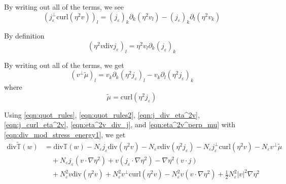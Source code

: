 \documentclass[a4paper]{article}
\newcommand{\curl}{\mathrm{curl}}
\renewcommand{\div}{\mathrm{div}}
\begin{document}
By writing out all of the terms, we see
\begin{equation}
  (j_\varepsilon^\perp \curl ( \eta^2 v ) )_l = (j_\varepsilon)_k \partial_k ( \eta^2 v_l ) - (j_\varepsilon)_k \partial_l ( \eta^2 v_k )
  \label{eqn:j_curl_eta^2v}
\end{equation}

By definition
\begin{equation}
  ( \eta^2 v \div j_\varepsilon )_l = \eta^2 v_l \partial_k (j_\varepsilon)_k
  \label{eqn:eta^2v_div_j}
\end{equation}

By writing out all of the terms, we get
\begin{equation}
  ( v^\perp \tilde{\mu} )_l = v_k \partial_k (\eta^2 j_\varepsilon)_l - v_k \partial_l (\eta^2 j_\varepsilon)_k
  \label{eqn:eta^2v^perp_mu}
\end{equation}
where
\begin{equation}
  \tilde{\mu} = \curl ( \eta^2 j_\varepsilon )
  \label{eqn:mu}
\end{equation}

Using \eqref{eqn:quot_rules}, \eqref{eqn:quot_rules2}, \eqref{eqn:j_div_eta^2v}, \eqref{eqn:j_curl_eta^2v}, \eqref{eqn:eta^2v_div_j}, and \eqref{eqn:eta^2v^perp_mu} with
\eqref{eqn:div_mod_stress_energy1}, we get
\begin{align}
  \div \tilde{\mathbb{T}}(w) &= \div \mathbb{T}(w) - N_\varepsilon j_\varepsilon \div(\eta^2 v) - N_\varepsilon v \div (\eta^2 j_\varepsilon) -
  N_\varepsilon j_\varepsilon^\perp \curl( \eta^2 v ) - N_\varepsilon v^\perp \tilde{\mu} \nonumber \\
  &\quad + N_\varepsilon j_\varepsilon ( v \cdot \nabla \eta^2 ) + v (j_\varepsilon \cdot \nabla \eta^2 ) - \nabla \eta^2 (v \cdot j) \nonumber \\
  &\quad + N_\varepsilon^2 v \div (\eta^2 v) + N_\varepsilon^2 v^\perp \curl ( \eta^2 v ) - N_\varepsilon^2 v (v \cdot \nabla \eta^2) + \frac{1}{2}
  N_\varepsilon^2 |v|^2 \nabla
  \eta^2
  \label{eqn:div_mod_stress_energy}
\end{align}
\end{document}
